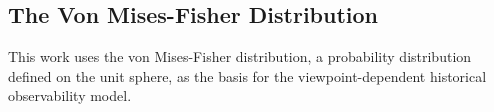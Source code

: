\subsection{The Von Mises-Fisher Distribution}

This work uses the von Mises-Fisher distribution, a probability distribution defined on the unit sphere, as the basis for the viewpoint-dependent historical observability model. 